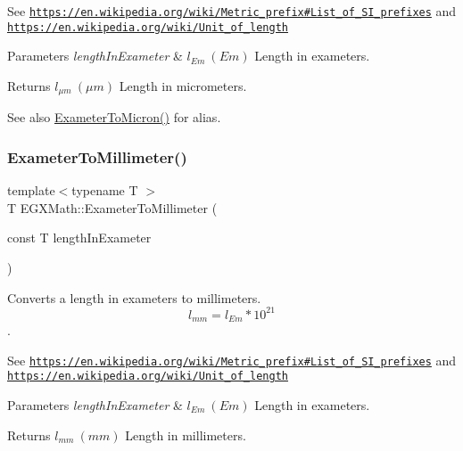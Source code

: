 See \href{https://en.wikipedia.org/wiki/Metric_prefix#List_of_SI_prefixes}{\tt https\+://en.\+wikipedia.\+org/wiki/\+Metric\+\_\+prefix\#\+List\+\_\+of\+\_\+\+S\+I\+\_\+prefixes} and \href{https://en.wikipedia.org/wiki/Unit_of_length}{\tt https\+://en.\+wikipedia.\+org/wiki/\+Unit\+\_\+of\+\_\+length} 
\begin{DoxyParams}{Parameters}
{\em length\+In\+Exameter} & $ l_{Em}\ (Em)$ Length in exameters. \\
\hline
\end{DoxyParams}
\begin{DoxyReturn}{Returns}
$ l_{\mu m}\ (\mu m)$ Length in micrometers. 
\end{DoxyReturn}
\begin{DoxySeeAlso}{See also}
\mbox{\hyperlink{group___e_g_x_math-_conversions-_length_conversions-_exameter-_non-_s_i_ga3356bb6585e02757a196b299c29660c1}{Exameter\+To\+Micron()}} for alias. 
\end{DoxySeeAlso}
\mbox{\label{group___e_g_x_math-_conversions-_length_conversions-_exameter-_s_i_ga71baa21a517793479c9bbb9e1a5c713b}} 
\subsubsection{\texorpdfstring{Exameter\+To\+Millimeter()}{ExameterToMillimeter()}}
{\footnotesize\ttfamily template$<$typename T $>$ \\
T E\+G\+X\+Math\+::\+Exameter\+To\+Millimeter (\begin{DoxyParamCaption}\item[{const T}]{length\+In\+Exameter }\end{DoxyParamCaption})}



Converts a length in exameters to millimeters. \[ l_{mm}=l_{Em} * 10^{21} \]. 

See \href{https://en.wikipedia.org/wiki/Metric_prefix#List_of_SI_prefixes}{\tt https\+://en.\+wikipedia.\+org/wiki/\+Metric\+\_\+prefix\#\+List\+\_\+of\+\_\+\+S\+I\+\_\+prefixes} and \href{https://en.wikipedia.org/wiki/Unit_of_length}{\tt https\+://en.\+wikipedia.\+org/wiki/\+Unit\+\_\+of\+\_\+length} 
\begin{DoxyParams}{Parameters}
{\em length\+In\+Exameter} & $ l_{Em}\ (Em)$ Length in exameters. \\
\hline
\end{DoxyParams}
\begin{DoxyReturn}{Returns}
$ l_{mm}\ (mm)$ Length in millimeters. 
\end{DoxyReturn}
\mbox{\label{group___e_g_x_math-_conversions-_length_conversions-_exameter-_s_i_ga78c5c3f8008fc44c81b3d89b44d3db19}} 
